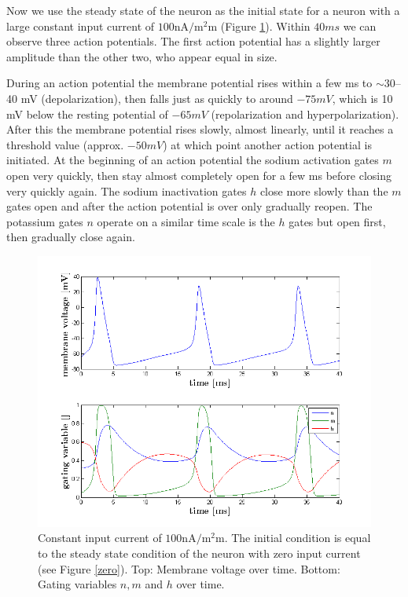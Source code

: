 \documentclass{scrartcl}
\begin{document}
Now we use the steady state of the neuron as the initial state for a neuron with a large constant input current of $100 \si{\nano\ampere\per\square\milli\meter}$ (Figure \ref{large}). Within $40 \si{ms}$ we can observe three action potentials. The first action potential has a slightly larger amplitude than the other two, who appear equal in size.

During an action potential the membrane potential rises within a few \si{ms} to $\sim$30--40 \si{mV} (depolarization), then falls just as quickly to around $-75 \si{mV}$, which is 10 \si{mV} below the resting potential of $-65\si{mV}$ (repolarization and hyperpolarization). After this the membrane potential rises slowly, almost linearly, until it reaches a threshold value (approx. $-50 \si{mV}$) at which point another action potential is initiated. At the beginning of an action potential the sodium activation gates $m$ open very quickly, then stay almost completely open for a few \si{ms} before closing very quickly again. The sodium inactivation gates $h$ close more slowly than the $m$ gates open and after the action potential is over only gradually reopen. The potassium gates $n$ operate on a similar time scale is the $h$ gates but open first, then gradually close again.

\begin{figure}
\centering
\includegraphics[trim = {1.4cm 0.3 1.8cm 1cm}, height=0.35\textheight, clip]{../pics/large}
\caption{Constant input current of $100 \si{\nano\ampere\per\square\milli\meter}$. The initial condition is equal to the steady state condition of the neuron with zero input current (see Figure \ref{zero}). Top: Membrane voltage over time. Bottom: Gating variables $n, m$ and $h$ over time.}
\label{large}
\end{figure}
\end{document}
